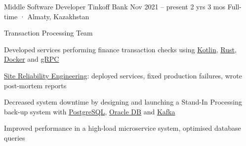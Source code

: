 \documentclass[11pt, a4paper]{style}
\begin{document}
\setcolumnwidth{5.5cm,2.7cm}
\begin{paracol}{2}



    \cvEntry
        {Middle Software Developer} {Tinkoff Bank}
        {Nov 2021 -- present} {2 yrs 3 mos}
        {Full-time · Almaty, Kazakhstan}
        {
            Transaction Processing Team \\
            \vspace{-5mm}
            \begin{cvItems}
                \item Developed services performing finance transaction checks using \underline{Kotlin}, \underline{Rust}, \underline{Docker} and \underline{gRPC}
                \item \underline{Site Reliability Engineering}: deployed services, fixed production failures, wrote post-mortem reports
                \item Decreased system downtime by designing and launching a Stand-In Processing back-up system with \underline{PostgreSQL}, \underline{Oracle DB} and \underline{Kafka}
                \item Improved performance in a high-load microservice system, optimised database queries
            \end{cvItems}
        }


\end{paracol}
\end{document}
